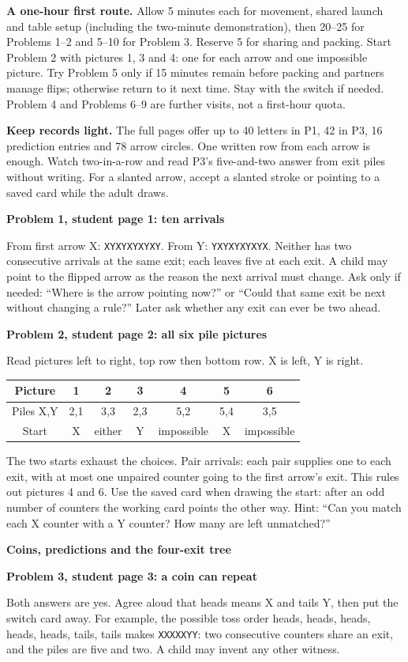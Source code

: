 \documentclass[11pt]{article}
\newcommand{\head}[1]{\par\textbf{\large #1}\par}
\newcommand{\sub}[1]{\par\textbf{#1}\par}
\newcommand{\code}[1]{\texttt{#1}}
\begin{document}
\textbf{A one-hour first route.} Allow 5 minutes each for movement, shared launch and table setup (including the two-minute demonstration), then 20--25 for Problems 1--2 and 5--10 for Problem 3. Reserve 5 for sharing and packing. Start Problem 2 with pictures 1, 3 and 4: one for each arrow and one impossible picture. Try Problem 5 only if 15 minutes remain before packing and partners manage flips; otherwise return to it next time. Stay with the switch if needed. Problem 4 and Problems 6--9 are further visits, not a first-hour quota.

\textbf{Keep records light.} The full pages offer up to 40 letters in P1, 42 in P3, 16 prediction entries and 78 arrow circles. One written row from each arrow is enough. Watch two-in-a-row and read P3's five-and-two answer from exit piles without writing. For a slanted arrow, accept a slanted stroke or pointing to a saved card while the adult draws.

\sub{Problem 1, student page 1: ten arrivals}
From first arrow X: \code{XYXYXYXYXY}. From Y: \code{YXYXYXYXYX}. Neither has two consecutive arrivals at the same exit; each leaves five at each exit. A child may point to the flipped arrow as the reason the next arrival must change. Ask only if needed: ``Where is the arrow pointing now?'' or ``Could that same exit be next without changing a rule?'' Later ask whether any exit can ever be two ahead.

\sub{Problem 2, student page 2: all six pile pictures}
Read pictures left to right, top row then bottom row. X is left, Y is right.
\begin{center}
\begin{tabular}{ccccccc}
\toprule
Picture & 1 & 2 & 3 & 4 & 5 & 6\\
\midrule
Piles X,Y & 2,1 & 3,3 & 2,3 & 5,2 & 5,4 & 3,5\\
Start & X & either & Y & impossible & X & impossible\\
\bottomrule
\end{tabular}
\end{center}
The two starts exhaust the choices. Pair arrivals: each pair supplies one to each exit, with at most one unpaired counter going to the first arrow's exit. This rules out pictures 4 and 6. Use the saved card when drawing the start: after an odd number of counters the working card points the other way. Hint: ``Can you match each X counter with a Y counter? How many are left unmatched?''
\newpage

\head{Coins, predictions and the four-exit tree}
\sub{Problem 3, student page 3: a coin can repeat}
Both answers are yes. Agree aloud that heads means X and tails Y, then put the switch card away. For example, the possible toss order heads, heads, heads, heads, heads, tails, tails makes \code{XXXXXYY}: two consecutive counters share an exit, and the piles are five and two. A child may invent any other witness.
\end{document}
